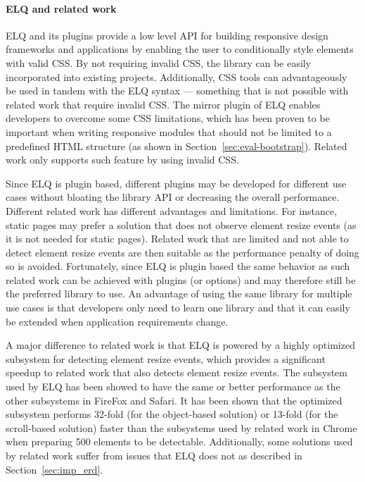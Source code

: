 \documentclass[a4paper,11pt]{kth-mag}
\begin{document}

    \paragraph{ELQ and related work}
    \gls{ELQ} and its plugins provide a low level \gls{API} for building \gls{responsive} design frameworks and applications by enabling the user to conditionally style \glspl{element} with valid \gls{CSS}.
    By not requiring invalid \gls{CSS}, the library can be easily incorporated into existing projects.
    Additionally, \gls{CSS} tools can advantageously be used in tandem with the \gls{ELQ} syntax --- something that is not possible with related work that require invalid \gls{CSS}.
    The mirror plugin of \gls{ELQ} enables developers to overcome some \gls{CSS} limitations, which has been proven to be important when writing \gls{responsive} modules that should not be limited to a predefined \gls{HTML} structure (as shown in Section~\ref{sec:eval-bootstrap}).
    Related work only supports such feature by using invalid \gls{CSS}.

    Since \gls{ELQ} is plugin based, different plugins may be developed for different use cases without bloating the library \gls{API} or decreasing the overall performance.
    Different related work has different advantages and limitations.
    For instance, static pages may prefer a solution that does not observe \gls{element} resize events (as it is not needed for static pages).
    Related work that are limited and not able to detect element resize events are then suitable as the performance penalty of doing so is avoided.
    Fortunately, since \gls{ELQ} is plugin based the same behavior as such related work can be achieved with plugins (or options) and may therefore still be the preferred library to use.
    An advantage of using the same library for multiple use cases is that developers only need to learn one library and that it can easily be extended when application requirements change.

    A major difference to related work is that \gls{ELQ} is powered by a highly optimized subsystem for detecting \gls{element} resize events, which provides a significant speedup to related work that also detects \gls{element} resize events.
    The subsystem used by \gls{ELQ} has been showed to have the same or better performance as the other subsystems in FireFox and Safari.
    It has been shown that the optimized subsystem performs 32-fold (for the object-based solution) or 13-fold (for the scroll-based solution) faster than the subsystems used by related work in Chrome when preparing 500 \glspl{element} to be detectable.
    Additionally, some solutions used by related work suffer from issues that \gls{ELQ} does not as described in Section~\ref{sec:imp_erd}.
\end{document}
